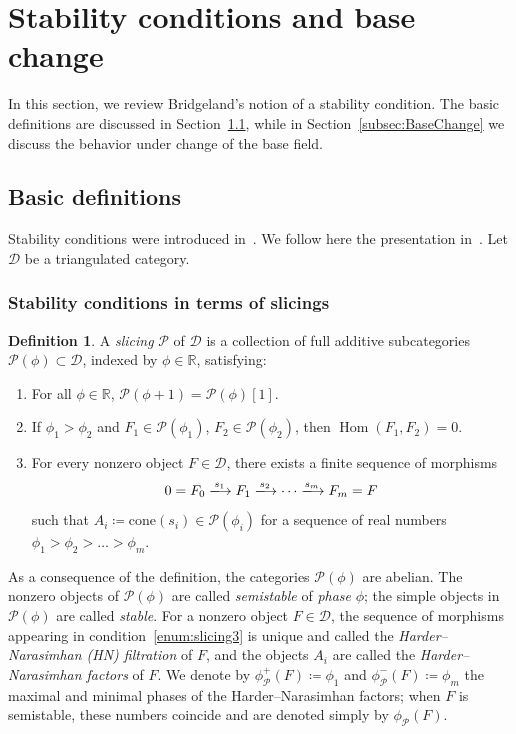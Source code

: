\documentclass[11pt, reqno]{amsart}
\numberwithin{equation}{section}
\theoremstyle{plain}
\theoremstyle{remark}
\theoremstyle{definition}
\newtheorem{definition}[theorem]{Definition}
\theoremstyle{italicsname}
\DeclareMathOperator{\Hom}{Hom}
\newcommand{\cD}{\mathscr{D}}
\newcommand{\cP}{\mathscr{P}}
\def\RR{\ensuremath{\mathbb{R}}}
\begin{document}

\section{Stability conditions and base change}\label{sec:StabilityConditionsBaseChange} 

In this section, we review Bridgeland's notion of a stability condition.
The basic definitions are discussed in Section~\ref{subsec:PreliminaryStability}, while in Section~\ref{subsec:BaseChange} we discuss the behavior under change of the base field.

\subsection{Basic definitions}\label{subsec:PreliminaryStability}

Stability conditions were introduced in~\cite{Bridgeland:Stab}.
We follow here the presentation in~\cite[Section 2]{curves}. 
Let $\cD$ be a triangulated category.

\subsubsection{Stability conditions in terms of slicings} 
\label{section-stability-conditions-slicings}
\begin{definition}\label{def:slicing}
A \emph{slicing} $\cP$ of $\cD$ is a collection of full additive subcategories $\cP(\phi)\subset\cD$, indexed by $\phi\in\RR$, satisfying:
\begin{enumerate}[{\rm (1)}]
\item\label{enum:slicing1} For all $\phi\in\RR$, $\cP(\phi+1)=\cP(\phi)[1]$. 
\item\label{enum:slicing2} If $\phi_1>\phi_2$ and $F_1\in\cP(\phi_1)$, $F_2\in\cP(\phi_2)$, then $\Hom(F_1,F_2)=0$. 
\item\label{enum:slicing3}
For every nonzero object $F \in \cD$, there exists a finite sequence of morphisms
\[ 
0 = F_0 \xlongrightarrow{s_1} F_1 \xlongrightarrow{s_2} \cdots \xlongrightarrow{s_m} F_m = F 
\]
such that $A_i\coloneqq\mathrm{cone}(s_i)\in\cP(\phi_i)$ for a sequence of real numbers 
$\phi_1 > \phi_2 > \dots > \phi_m$. 
\end{enumerate}
\end{definition}

As a consequence of the definition, the categories $\cP(\phi)$ are abelian.
The nonzero objects of $\cP(\phi)$ are called \emph{semistable} of \emph{phase} $\phi$; the simple objects in $\cP(\phi)$ are called \emph{stable}. 
For a nonzero object $F\in\cD$, the sequence of morphisms appearing in condition~\ref{enum:slicing3} is unique and called the \emph{Harder--Narasimhan (HN) filtration} of $F$, and the objects $A_i$ are called the \emph{Harder--Narasimhan factors} of $F$. 
We denote by $\phi_\cP^+(F)\coloneqq \phi_1$ and $\phi_\cP^-(F)\coloneqq\phi_m$ the maximal and minimal phases of the Harder--Narasimhan factors; when $F$ is semistable, these numbers coincide and are denoted simply by $\phi_{\cP}(F)$.
\end{document}
